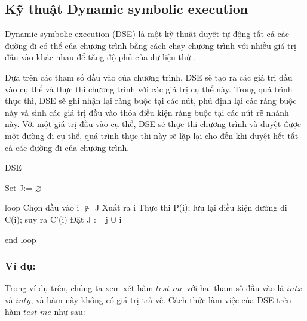 \subsection{Kỹ thuật Dynamic symbolic execution}

Dynamic symbolic execution (DSE) là một kỹ thuật duyệt tự động tất cả các đường đi có thể của chương trình bằng cách chạy chương trình với nhiều giá trị đầu vào khác nhau để tăng độ phủ của dữ liệu thử \cite{xie2009fitness}.

Dựa trên các tham số đầu vào của chương trình, DSE sẽ tạo ra các giá trị đầu vào cụ thể và thực thi chương trình với các giá trị cụ thể này. Trong quá trình thực thi, DSE sẽ ghi nhận lại ràng buộc tại các nút, phủ định lại các ràng buộc này và sinh các giá trị đầu vào thỏa điều kiện ràng buộc tại các nút rẽ nhánh này. Với một giá trị đầu vào cụ thể, DSE sẽ thực thi chương trình và duyệt được một đường đi cụ thể, quá trình thực thi này sẽ lặp lại cho đến khi duyệt hết tất cả các đường đi của chương trình.

\begin{algorithm}
	\caption{DSE}
	\begin{algorithmic}	
		\item Set J:= $\varnothing $ 
		\item loop
			\subitem Chọn đầu vào i $\notin $ J 
			\subitem Xuất ra i
			\subitem Thực thi P(i); lưu lại điều kiện đường đi C(i); suy ra C'(i)
			\subitem Đặt J := j $\cup $ i			
		\item end loop
	\end{algorithmic}
\end{algorithm}

\subsubsection*{Ví dụ:}


	
Trong ví dụ trên, chúng ta xem xét hàm $test\_me$ với hai tham số đầu vào là $int x$ và $int y$, và hàm này không có giá trị trả về. Cách thức làm việc của DSE trên hàm $test\_me$ như sau: 

